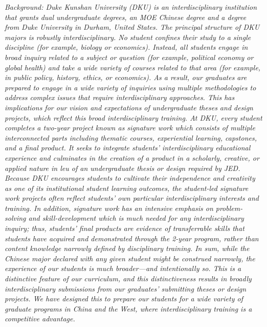 \documentclass[11pt,a4paper,oneside]{report}
\newcommand{\instructions}[1]{{\color{black}\itshape #1}}
\begin{document}
\instructions{Background:  Duke Kunshan University (DKU) is an interdisciplinary institution that grants dual undergraduate degrees, an MOE Chinese degree and a degree from Duke University in Durham, United States. The principal structure of DKU majors is robustly interdisciplinary. No student confines their study to a single discipline (for example, biology or economics). Instead, all students engage in broad inquiry related to a subject or question (for example, political economy or global health) and take a wide variety of courses related to that area (for example, in public policy, history, ethics, or economics). As a result, our graduates are prepared to engage in a wide variety of inquiries using multiple methodologies to address complex issues that require interdisciplinary approaches.  
This has implications for our vision and expectations of undergraduate theses and design projects, which reflect this broad interdisciplinary training. At DKU, every student completes a two-year project known as signature work which consists of multiple interconnected parts including thematic courses, experiential learning, capstones, and a final product. It seeks to integrate students’ interdisciplinary educational experience and culminates in the creation of a product in a scholarly, creative, or applied nature in leu of an undergraduate thesis or design required by JED. Because DKU encourages students to cultivate their independence and creativity as one of its institutional student learning outcomes, the student-led signature work projects often reflect students’ own particular interdisciplinary interests and training.  In addition, signature work has an intensive emphasis on problem-solving and skill-development which is much needed for any interdisciplinary inquiry; thus, students’ final products are evidence of transferrable skills that students have acquired and demonstrated through the 2-year program, rather than content knowledge narrowly defined by disciplinary training.  
In sum, while the Chinese major declared with any given student might be construed narrowly, the experience of our students is much broader—and intentionally so.  This is a distinctive feature of our curriculum, and this distinctiveness results in broadly interdisciplinary submissions from our graduates’ submitting theses or design projects. We have designed this to prepare our students for a wide variety of graduate programs in China and the West, where interdisciplinary training is a competitive advantage.}

\newcommand{\authorname}{First\_Name Last\_Name}
\end{document}
